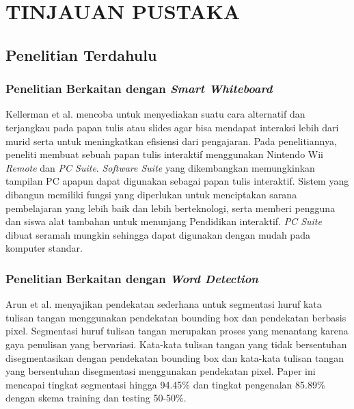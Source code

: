 
\chapter{TINJAUAN PUSTAKA}
\label{chap:tinjauanpustaka}


\section{Penelitian Terdahulu}
\label{sec:penelitianterdahulu}

\subsection{Penelitian Berkaitan dengan \textit{Smart Whiteboard}}
\label{subsec:penelitianterkaitsmartwhiteboard}
Kellerman et al. \citep*{kellerman2018smart} mencoba untuk menyediakan suatu cara alternatif dan terjangkau pada papan tulis atau slides agar bisa mendapat interaksi lebih dari murid serta untuk meningkatkan efisiensi dari pengajaran. Pada penelitiannya, peneliti membuat sebuah papan tulis interaktif menggunakan Nintendo Wii \textit{Remote} dan \textit{PC Suite}. \textit{Software Suite} yang dikembangkan memungkinkan tampilan PC apapun dapat digunakan sebagai papan tulis interaktif. Sistem yang dibangun memiliki fungsi yang diperlukan untuk menciptakan sarana pembelajaran yang lebih baik dan lebih berteknologi, serta memberi pengguna dan siswa alat tambahan untuk menunjang Pendidikan interaktif. \textit{PC Suite} dibuat seramah mungkin sehingga dapat digunakan dengan mudah pada komputer standar. \par

\subsection{Penelitian Berkaitan dengan \textit{Word Detection}}
\label{subsec:penelitianterkaitworddetection}
Arun et al. \citep*{arun2019handwritten} menyajikan pendekatan sederhana untuk segmentasi huruf kata tulisan tangan menggunakan pendekatan bounding box dan pendekatan berbasis pixel. Segmentasi huruf tulisan tangan merupakan proses yang menantang karena gaya penulisan yang bervariasi. Kata-kata tulisan tangan yang tidak bersentuhan disegmentasikan dengan pendekatan bounding box dan kata-kata tulisan tangan yang bersentuhan disegmentasi menggunakan pendekatan pixel. Paper ini mencapai tingkat segmentasi hingga 94.45\% dan tingkat pengenalan 85.89\% dengan skema training dan testing 50-50\%. \par

